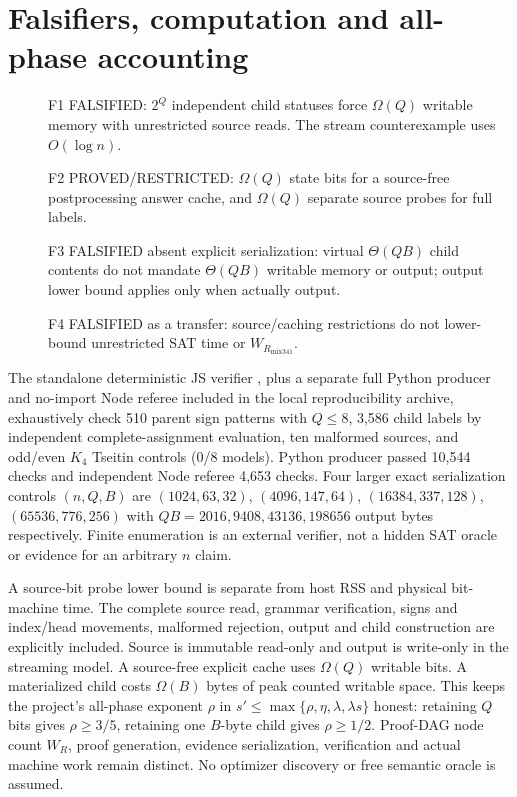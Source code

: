 \documentclass[11pt]{article}
\begin{document}
\section*{Falsifiers, computation and all-phase accounting}
\begin{description}
\item[] F1 FALSIFIED: $2^Q$ independent child statuses force $\Omega(Q)$ writable memory with unrestricted source reads. The stream counterexample uses $O(\log n)$.
\item[] F2 PROVED/RESTRICTED: $\Omega(Q)$ state bits for a source-free postprocessing answer cache, and $\Omega(Q)$ separate source probes for full labels.
\item[] F3 FALSIFIED absent explicit serialization: virtual $\Theta(QB)$ child contents do not mandate $\Theta(QB)$ writable memory or output; output lower bound applies only when actually output.
\item[] F4 FALSIFIED as a transfer: source/caching restrictions do not lower-bound unrestricted SAT time or $W_{R_{\mathrm{mix341}}}$.
\end{description}
The standalone deterministic JS verifier , plus a separate full Python producer and no-import Node referee included in the local reproducibility archive, exhaustively check 510 parent sign patterns with $Q\le8$, 3,586 child labels by independent complete-assignment evaluation, ten malformed sources, and odd/even $K_4$ Tseitin controls (0/8 models). Python producer passed 10,544 checks and independent Node referee 4,653 checks. Four larger exact serialization controls $(n,Q,B)$ are $(1024,63,32)$, $(4096,147,64)$, $(16384,337,128)$, $(65536,776,256)$ with $QB=2016,9408,43136,198656$ output bytes respectively. Finite enumeration is an external verifier, not a hidden SAT oracle or evidence for an arbitrary $n$ claim.

A source-bit probe lower bound is separate from host RSS and physical bit-machine time. The complete source read, grammar verification, signs and index/head movements, malformed rejection, output and child construction are explicitly included. Source is immutable read-only and output is write-only in the streaming model. A source-free explicit cache uses $\Omega(Q)$ writable bits. A materialized child costs $\Omega(B)$ bytes of peak counted writable space. This keeps the project's all-phase exponent $\rho$ in $s'\le\max\{\rho,\eta,\lambda,\lambda s\}$ honest: retaining $Q$ bits gives $\rho\ge3/5$, retaining one $B$-byte child gives $\rho\ge1/2$. Proof-DAG node count $W_R$, proof generation, evidence serialization, verification and actual machine work remain distinct. No optimizer discovery or free semantic oracle is assumed.
\end{document}
